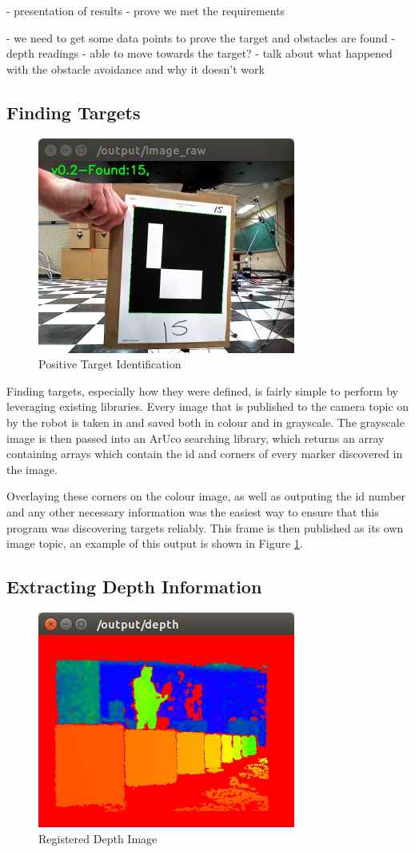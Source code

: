\documentclass{article}[12]
\begin{document}
	- presentation of results
- prove we met the requirements

- we need to get some data points to prove the target and obstacles are found
- depth readings
- able to move towards the target? 
- talk about what happened with the obstacle avoidance and why it doesn't work


\subsection{Finding Targets}

\begin{figure}[H]
	\centering
	\includegraphics[width=0.45\linewidth]{resultsTarget}
	\caption{Positive Target Identification}
	\label{fig:targ}
\end{figure}

Finding targets, especially how they were defined, is fairly simple to perform by leveraging existing libraries. Every image that is published to the camera topic on by the robot is taken in and saved both in colour and in grayscale. The grayscale image is then passed into an ArUco searching library, which returns an array containing arrays which contain the id and corners of every marker discovered in the image.

Overlaying these corners on the colour image, as well as outputing the id number and any other necessary information was the easiest way to ensure that this program was discovering targets reliably. This frame is then published as its own image topic, an example of this output is shown in Figure \ref{fig:targ}.

\subsection{Extracting Depth Information}

\begin{figure}[H]
	\centering
	\includegraphics[width=0.45\linewidth]{verificationDepth}
	\caption{Registered Depth Image}
	\label{fig:deeeeeeeeeeeeeeeeeeeeeeeeeeeeeeeeeeeeeeeeeeeeeeeeeeeeeep}
\end{figure}
\end{document}
